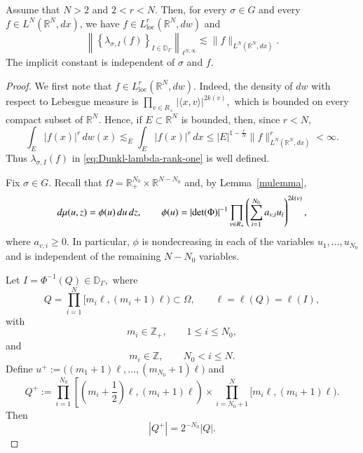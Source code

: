 \documentclass[12pt]{amsart}
\begin{document}
\begin{lemma}\label{lem:Cwikel-lambda-weak}
Assume that $N>2$ and $2<r<N$. Then, for every $\sigma\in G$ and
every $f\in L^N(\mathbb R^N,dx)$, we have
$f\in L^r_{\mathrm{loc}}(\mathbb R^N,dw)$ and
\begin{equation}\label{eq:Cwikel-lambda-weak}
\left\|
\left\{
\lambda_{\sigma,I}(f)
\right\}_{I\in\mathbb D_\Gamma}
\right\|_{\ell^{N,\infty}}
\lesssim
\|f\|_{L^N(\mathbb R^N,dx)}.
\end{equation}
The implicit constant is independent of $\sigma$ and $f$.
\end{lemma}
\begin{proof}
We first note that
$
f\in L^r_{\mathrm{loc}}(\mathbb R^N,dw).
$
Indeed, the density of $dw$ with respect to Lebesgue measure is
$
\prod_{v\in R_+}|\langle x,v\rangle|^{2k(v)},
$
which is bounded on every compact subset of $\mathbb R^N$. Hence, if
$E\subset\mathbb R^N$ is bounded, then, since $r<N$,
\[
\int_E |f(x)|^r\,dw(x)
\lesssim_E
\int_E |f(x)|^r\,dx
\leq
|E|^{1-\frac rN}
\|f\|_{L^N(\mathbb R^N,dx)}^r
<\infty.
\]
Thus $\lambda_{\sigma,I}(f)$ in
\eqref{eq:Dunkl-lambda-rank-one} is well defined.

Fix $\sigma\in G$. Recall that
$
\Omega
=
\mathbb R_+^{N_0}\times\mathbb R^{N-N_0}
$
and, by Lemma~\ref{mulemma},
\begin{equation}\label{eq:Cwikel-lambda-density}
d\mu(u,z)
=
\phi(u)\,du\,dz,
\qquad
\phi(u)
=
|{\rm det}(\Phi)|^{-1}
\prod_{v\in R_+}
\left(
\sum_{i=1}^{N_0}a_{v,i}u_i
\right)^{2k(v)},
\end{equation}
where
$
a_{v,i}\geq0.
$
In particular, $\phi$ is nondecreasing in each of the variables
$u_1,\ldots,u_{N_0}$ and is independent of the remaining
$N-N_0$ variables.

Let
$
I=\Phi^{-1}(Q)\in\mathbb D_\Gamma,
$
where
\[
Q
=
\prod_{i=1}^N
[m_i\ell,(m_i+1)\ell)
\subset\Omega,
\qquad
\ell=\ell(Q)=\ell(I),
\]
with
\[
m_i\in\mathbb Z_+,
\qquad 1\leq i\leq N_0,
\]
and
\[
m_i\in\mathbb Z,
\qquad N_0<i\leq N.
\]
Define
$
u^+
:=
\bigl(
(m_1+1)\ell,\ldots,(m_{N_0}+1)\ell
\bigr)
$
and
\[
Q^+
:=
\prod_{i=1}^{N_0}
\left[
\left(m_i+\frac12\right)\ell,
(m_i+1)\ell
\right)
\times
\prod_{i=N_0+1}^{N}
[m_i\ell,(m_i+1)\ell).
\]
Then
\[
|Q^+|=2^{-N_0}|Q|.
\]


\end{proof}
\end{document}
